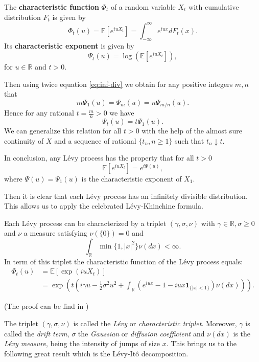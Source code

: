 \begin{defn}\label{def:Levy:CF_CE}
The \textbf{characteristic function} $\Phi_t$ of a random variable $X_t$ with cumulative distribution $F_t$ is given by
$$\Phi_t(u) = \mathbb{E}\left[e^{iu X_t}\right]=\int_{-\infty}^{\infty}e^{iu x}dF_t(x).$$
Its \textbf{characteristic exponent} is given by
$$\Psi_t(u) = \log\left(\mathbb{E}\left[e^{iu X_t}\right]\right),$$
for $u \in\mathbb{R}$ and $t>0$.
\end{defn}

 Then using twice equation \eqref{eq:inf-div} we obtain for any positive integers $m,n$ that
$$m\Psi_1(u) = \Psi_m(u) = n \Psi_{m/n}(u).$$
Hence for any rational $t=\frac{m}{n}>0$ we have
$$\Psi_t(u) = t\Psi_1(u).$$
We can generalize this relation for all $t>0$ with the help of the almost sure continuity of $X$ and a sequence of rational $\{t_n, n\geq 1\}$ such that $t_n\downarrow t$.

In conclusion, any L\'evy process has the property that for all $t>0$
$$\mathbb{E}\left[e^{iu X_t}\right] = e^{t\Psi(u)},$$
where $\Psi(u) = \Psi_1(u)$ is the characteristic exponent of $X_1$.

Then it is clear that each L\'evy process has an infinitely divisible distribution. This allows us to apply the celebrated L\'evy-Khinchine formula. 

\begin{thm}\label{thm:Levy:LK}
Each L\'evy process can be characterized by a triplet $(\gamma,\sigma,\nu)$ with $\gamma \in \mathbb{R},\sigma \geq 0$ and $\nu$ a measure satisfying $\nu(\{0\}) = 0$ and
$$\int_\mathbb{R} \min\{1,|x|^2\}\nu(dx)<\infty.$$
In term of this triplet the characteristic function of the L\'evy process equals:
\begin{align}\label{eq:LK}
\Phi_t(u) &= \mathbb{E}\left[\exp(i u X_t)\right]\nonumber\\
&= \exp\left(t\left(i\gamma u -\frac{1}{2}\sigma^2u^2+\int_\mathbb{R}\left(e^{iux}-1-iux\mathbf{1}_{\{|x|<1\}}\right)\nu(dx)\right)\right).
\end{align}
\end{thm}
(The proof can be find in \citeauthor{TC03} \citeyearpar{TC03} \cite{TC03})

The triplet $(\gamma,\sigma,\nu)$ is called the \textit{L\'evy} or \textit{characteristic triplet}. Moreover, $\gamma$ is called the \textit{drift term}, $\sigma$ the \textit{Gaussian} or \textit{diffusion coefficient} and $\nu(dx)$ is the \textit{L\'evy measure}, being the intensity of jumps of size $x$. This brings us to the following great result which is the L\'evy-Itô decomposition.

